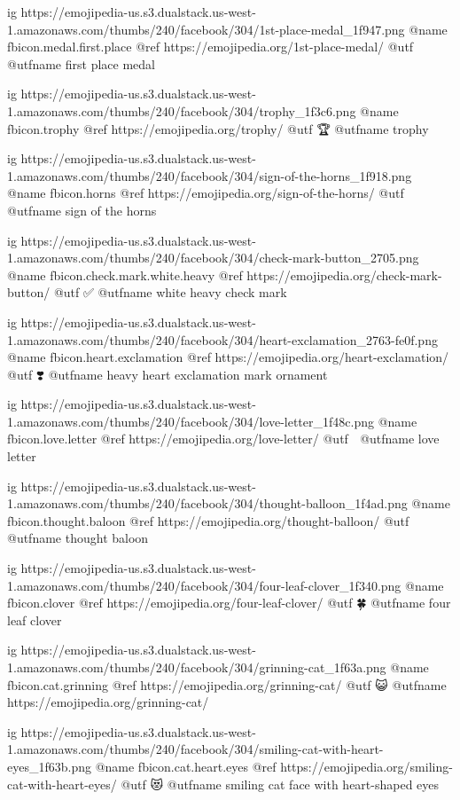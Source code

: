   ig https://emojipedia-us.s3.dualstack.us-west-1.amazonaws.com/thumbs/240/facebook/304/1st-place-medal_1f947.png
  @name fbicon.medal.first.place
  @ref https://emojipedia.org/1st-place-medal/
  @utf 🥇
  @utfname first place medal

  ig https://emojipedia-us.s3.dualstack.us-west-1.amazonaws.com/thumbs/240/facebook/304/trophy_1f3c6.png
  @name fbicon.trophy
  @ref https://emojipedia.org/trophy/
  @utf 🏆
  @utfname trophy

  ig https://emojipedia-us.s3.dualstack.us-west-1.amazonaws.com/thumbs/240/facebook/304/sign-of-the-horns_1f918.png
  @name fbicon.horns
  @ref https://emojipedia.org/sign-of-the-horns/
  @utf 🤘
  @utfname sign of the horns

  ig https://emojipedia-us.s3.dualstack.us-west-1.amazonaws.com/thumbs/240/facebook/304/check-mark-button_2705.png
  @name fbicon.check.mark.white.heavy
  @ref https://emojipedia.org/check-mark-button/
  @utf ✅
  @utfname white heavy check mark

  ig https://emojipedia-us.s3.dualstack.us-west-1.amazonaws.com/thumbs/240/facebook/304/heart-exclamation_2763-fe0f.png
  @name fbicon.heart.exclamation
  @ref https://emojipedia.org/heart-exclamation/
  @utf ❣️
  @utfname heavy heart exclamation mark ornament

  ig https://emojipedia-us.s3.dualstack.us-west-1.amazonaws.com/thumbs/240/facebook/304/love-letter_1f48c.png
  @name fbicon.love.letter
  @ref https://emojipedia.org/love-letter/
  @utf 💌
  @utfname love letter

  ig https://emojipedia-us.s3.dualstack.us-west-1.amazonaws.com/thumbs/240/facebook/304/thought-balloon_1f4ad.png
  @name fbicon.thought.baloon
  @ref https://emojipedia.org/thought-balloon/
  @utf 💭
  @utfname thought baloon

  ig https://emojipedia-us.s3.dualstack.us-west-1.amazonaws.com/thumbs/240/facebook/304/four-leaf-clover_1f340.png
  @name fbicon.clover
  @ref https://emojipedia.org/four-leaf-clover/
  @utf 🍀
  @utfname four leaf clover

  ig https://emojipedia-us.s3.dualstack.us-west-1.amazonaws.com/thumbs/240/facebook/304/grinning-cat_1f63a.png
  @name fbicon.cat.grinning
  @ref https://emojipedia.org/grinning-cat/
  @utf 😺
  @utfname https://emojipedia.org/grinning-cat/

  ig https://emojipedia-us.s3.dualstack.us-west-1.amazonaws.com/thumbs/240/facebook/304/smiling-cat-with-heart-eyes_1f63b.png
  @name fbicon.cat.heart.eyes
  @ref https://emojipedia.org/smiling-cat-with-heart-eyes/
  @utf 😻
  @utfname smiling cat face with heart-shaped eyes

